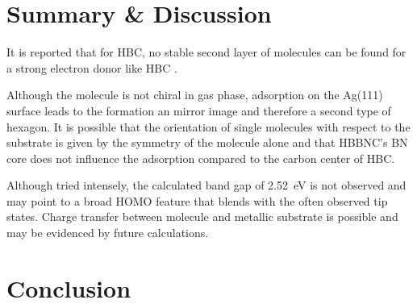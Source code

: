 \section{Summary \& Discussion}
It is reported that for HBC, no stable second layer of molecules can be found for a strong electron donor like HBC \cite{de_feyter_two-dimensional_2003}.

Although the molecule is not chiral in gas phase, adsorption on the Ag(111) surface leads to the formation an mirror image and therefore a second type of hexagon. It is possible that the orientation of single molecules with respect to the substrate is given by the symmetry of the molecule alone and that HBBNC's BN core does not influence the adsorption compared to the carbon center of HBC.

Although tried intensely, the calculated band gap of \SI{2.52}{\eV} is not observed and may point to a broad HOMO feature that blends with the often observed tip states.
Charge transfer between molecule and metallic substrate is possible and may be evidenced by future calculations.

\section{Conclusion}